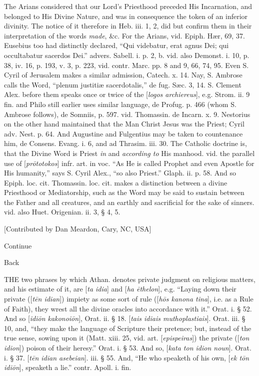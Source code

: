 The
Arians considered that our Lord's Priesthood preceded His Incarnation,
and belonged to His Divine Nature, and was in consequence the token of
an inferior divinity. The notice of it therefore in Heb. iii. 1, 2,
did but confirm them in their interpretation of the words \emph{made},
\&c. For the Arians, vid. Epiph. Hær, 69, 37. Eusebius too had
distinctly declared, ``Qui videbatur, erat agnus Dei; qui
occultabatur sacerdos Dei.'' advers. Sabell. i. p. 2, b. vid. also
Demonst. i. 10, p. 38, iv. 16, p. 193, v. 3, p. 223, vid. contr. Marc.
pp. 8 and 9, 66, 74, 95. Even S. Cyril of Jerusalem makes a similar
admission, Catech. x. 14. Nay, S. Ambrose calls the Word, ``plenum
justitiæ sacerdotalis,'' de fug. Sæc. 3, 14. S. Clement Alex. before
them speaks once or twice of the [\emph{logos archiereus}], e.g.
Strom. ii. 9 fin. and Philo still earlier uses similar language, de
Profug. p. 466 (whom S. Ambrose follows), de Somniis, p. 597. vid.
Thomassin. de Incarn. x. 9. Nestorius on the other hand maintained
that the Man Christ Jesus was the Priest; Cyril adv. Nest. p. 64. And
Augustine and Fulgentius may be taken to countenance him, de Consens.
Evang. i. 6, and ad Thrasim. iii. 30. The Catholic doctrine is, that
the Divine Word is Priest \emph{in} and \emph{according to} His
manhood. vid. the parallel use of [\emph{pr\={o}totokos}] infr.
art. in voc. ``As He is called Prophet and even Apostle for His
humanity,'' says S. Cyril Alex., ``so also Priest.'' Glaph. ii. p. 58.
And so Epiph. loc. cit. Thomassin. loc. cit. makes a distinction
between a divine Priesthood or Mediatorship, such as the Word may be
said to sustain between the Father and all creatures, and an earthly
and sacrificial for the sake of sinners. vid. also Huet. Origenian.
ii. 3, § 4, 5.

[Contributed by Dan Meardon, Cary, NC, USA]

Continue

Back


THE
two phrases by which Athan. denotes private judgment on religious
matters, and his estimate of it, are [\emph{ta idia}] and [\emph{ha \={e}thelon}],
e.g. ``Laying
down their private ([\emph{t\={e}n idian}]) impiety as some sort of
rule ([\emph{h\={o}s kanona tina}], i.e. as a Rule of Faith), they
wrest all the divine oracles into accordance with it.'' Orat. i. § 52.
And so [\emph{idi\={o}n kakonoi\={o}n}], Orat. ii. § 18. [\emph{tais
idiais muthoplastiais}]. Orat. iii. § 10, and, ``they make the
language of Scripture their pretence; but, instead of the true sense,
sowing upon it (Matt. xiii. 25, vid. art. [\emph{epispeiras}]) the
private ([\emph{ton idion}]) poison of their heresy.'' Orat. i. § 53.
And so, [\emph{kata ton idion noun}]. Orat. i. § 37. [\emph{t\={e}n
idian asebeian}]. iii. § 55. And, ``He who speaketh of his own, [\emph{ek
t\={o}n idi\={o}n}], speaketh a lie.'' contr. Apoll. i. fin.

